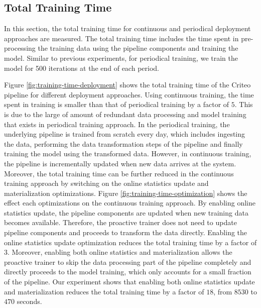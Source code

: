 \subsection{Total Training Time}
In this section, the total training time for continuous and periodical deployment approaches are measured.
The total training time includes the time spent in pre-processing the training data using the pipeline components and training the model.
Similar to previous experiments, for periodical training, we train the model for 500 iterations at the end of each period.

Figure \ref{fig:training-time-deployment} shows the total training time of the Criteo pipeline for different deployment approaches.
Using continuous training, the time spent in training is smaller than that of periodical training by a factor of $5$.
This is due to the large of amount of redundant data processing and model training that exists in periodical training approach.
In the periodical training, the underlying pipeline is trained from scratch every day, which includes ingesting the data, performing the data transformation steps of the pipeline and finally training the model using the transformed data.
However, in continuous training, the pipeline is incrementally updated when new data arrives at the system.
Moreover, the total training time can be further reduced in the continuous training approach by switching on the online statistics update and materialization optimizations.
Figure \ref{fig:training-time-optimization} shows the effect each optimizations on the continuous training approach.
By enabling online statistics update, the pipeline components are updated when new training data becomes available.
Therefore, the proactive trainer does not need to update pipeline components and proceeds to transform the data directly.
Enabling the online statistics update optimization reduces the total training time by a factor of 3.
Moreover, enabling both online statistics and materialization allows the proactive trainer to skip the data processing part of the pipeline completely and directly proceeds to the model training, which only accounts for a small fraction of the pipeline.
Our experiment shows that enabling both online statistics update and materialization reduces the total training time by a factor of $18$, from $8530$ to $470$ seconds.


